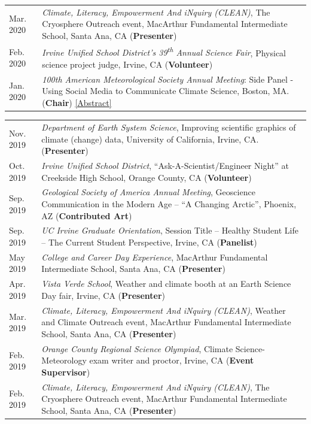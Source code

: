 \documentclass[margin,line,palatino,courier,10pt]{res}
\begin{document}
\begin{resume}
\begin{tabular}{@{}p{0.9in}p{4in}}
Mar. 2020 &\textit{Climate, Literacy, Empowerment And iNquiry (CLEAN)}, The Cryosphere Outreach event, MacArthur Fundamental Intermediate School, Santa Ana, CA (\textbf{Presenter})\\
Feb. 2020 & \textit{Irvine Unified School District's 39\textsuperscript{th} Annual Science Fair}, Physical science project judge, Irvine, CA (\textbf{Volunteer})\\
Jan. 2020 & \textit{100th American Meteorological Society Annual Meeting}: Side Panel - Using Social Media to Communicate Climate Science, Boston, MA. (\textbf{Chair}) \href{https://ams.confex.com/ams/2020Annual/meetingapp.cgi/Session/53195}{[Abstract]}\\
\end{tabular}
\begin{tabular}{@{}p{0.9in}p{4in}}
Nov. 2019 & \textit{Department of Earth System Science}, Improving scientific graphics of climate (change) data, University of California, Irvine, CA. (\textbf{Presenter})\\
Oct. 2019 & \textit{Irvine Unified School District}, ``Ask-A-Scientist/Engineer Night'' at Creekside High School, Orange County, CA (\textbf{Volunteer})\\
Sep. 2019 & \textit{Geological Society of America Annual Meeting}, Geoscience Communication in the Modern Age -- ``A Changing Arctic'', Phoenix, AZ (\textbf{Contributed Art})\\
Sep. 2019 & \textit{UC Irvine Graduate Orientation}, Session Title -- Healthy Student Life -- The Current Student Perspective, Irvine, CA (\textbf{Panelist})\\
May 2019 & \textit{College and Career Day Experience}, MacArthur Fundamental Intermediate School, Santa Ana, CA (\textbf{Presenter})\\
Apr. 2019 & \textit{Vista Verde School}, Weather and climate booth at an Earth Science Day fair, Irvine, CA (\textbf{Presenter})\\
Mar. 2019 & \textit{Climate, Literacy, Empowerment And iNquiry (CLEAN)}, Weather and Climate Outreach event, MacArthur Fundamental Intermediate School, Santa Ana, CA (\textbf{Presenter})\\
Feb. 2019 & \textit{Orange County Regional Science Olympiad}, Climate Science-Meteorology exam writer and proctor, Irvine, CA (\textbf{Event Supervisor})\\
Feb. 2019 & \textit{Climate, Literacy, Empowerment And iNquiry (CLEAN)}, The Cryosphere Outreach event, MacArthur Fundamental Intermediate School, Santa Ana, CA (\textbf{Presenter})\\

\end{tabular}
\end{resume}
\end{document}
